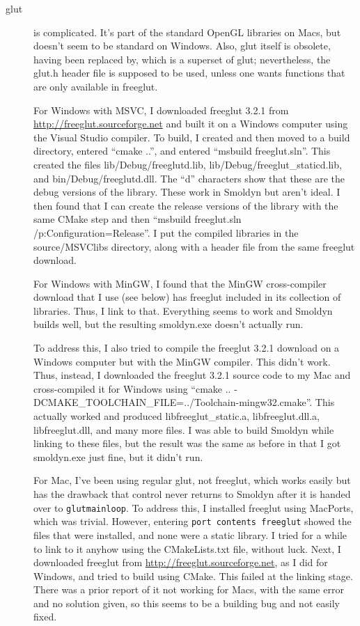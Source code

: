 \documentclass {scrbook}
\newcommand {\ttt} {\texttt}
\begin{document}
\begin{description}

\item[glut] is complicated. It's part of the standard OpenGL libraries on Macs, but doesn't seem to be standard on Windows. Also, glut itself is obsolete, having been replaced by, which is a superset of glut; nevertheless, the glut.h header file is supposed to be used, unless one wants functions that are only available in freeglut.

For Windows with MSVC, I downloaded freeglut 3.2.1 from \url{http://freeglut.sourceforge.net} and built it on a Windows computer using the Visual Studio compiler. To build, I created and then moved to a build directory, entered ``cmake ..'', and entered ``msbuild freeglut.sln''. This created the files lib/Debug/freeglutd.lib, lib/Debug/freeglut\_staticd.lib, and bin/Debug/freeglutd.dll. The ``d'' characters show that these are the debug versions of the library. These work in Smoldyn but aren't ideal. I then found that I can create the release versions of the library with the same CMake step and then ``msbuild freeglut.sln /p:Configuration=Release''. I put the compiled libraries in the source/MSVClibs directory, along with a header file from the same freeglut download.

For Windows with MinGW, I found that the MinGW cross-compiler download that I use (see below) has freeglut included in its collection of libraries. Thus, I link to that. Everything seems to work and Smoldyn builds well, but the resulting smoldyn.exe doesn't actually run.

To address this, I also tried to compile the freeglut 3.2.1 download on a Windows computer but with the MinGW compiler. This didn't work. Thus, instead, I downloaded the freeglut 3.2.1 source code to my Mac and cross-compiled it for Windows using ``cmake .. -DCMAKE\_TOOLCHAIN\_FILE=../Toolchain-mingw32.cmake''. This actually worked and produced libfreeglut\_static.a, libfreeglut.dll.a, libfreeglut.dll, and many more files. I was able to build Smoldyn while linking to these files, but the result was the same as before in that I got smoldyn.exe just fine, but it didn't run.

For Mac, I've been using regular glut, not freeglut, which works easily but has the drawback that control never returns to Smoldyn after it is handed over to \ttt{glutmainloop}. To address this, I installed freeglut using MacPorts, which was trivial. However, entering \ttt{port contents freeglut} showed the files that were installed, and none were a static library. I tried for a while to link to it anyhow using the CMakeLists.txt file, without luck. Next, I downloaded freeglut from \url{http://freeglut.sourceforge.net}, as I did for Windows, and tried to build using CMake. This failed at the linking stage. There was a prior report of it not working for Macs, with the same error and no solution given, so this seems to be a building bug and not easily fixed.


\end{description}
\end{document}

